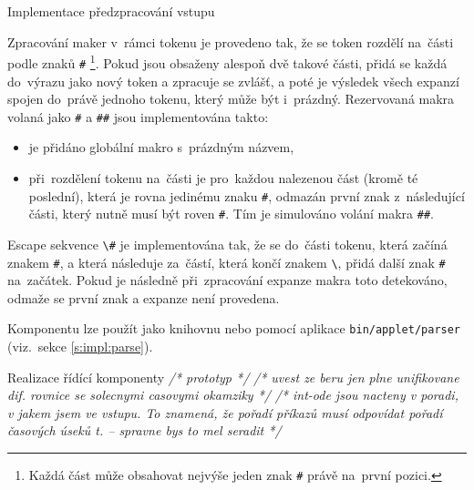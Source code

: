 \documentclass[thesis=M,czech]{FITthesis}[2012/06/26]
\newcommand{\cmt}[1]{\textit{/* #1 */}}
\newcommand{\id}[1]{\texttt{#1}}
\newcommand{\rf}[1]{\ref{#1}}
\newcommand{\binDir}{\id{bin}}
\newcommand{\appletDir}{\id{\binDir{}/\-applet}}
\newcommand{\appletFn}[1]{\id{\appletDir{}/\-#1}}
\begin{document}
\begin{section}{Implementace předzpracování vstupu}

\begin{paragraph}{Zpracování maker v~rámci tokenu}
\label{s:impl:preprocess:in_token}
je provedeno tak, že se token rozdělí na~části
podle znaků \id{\#}%
\footnote{Každá část může obsahovat nejvýše jeden znak \id{\#}
právě na~první pozici.}.
Pokud jsou obsaženy alespoň dvě takové části,
přidá se každá do~výrazu
jako nový token a zpracuje se zvlášť,
a poté je výsledek všech expanzí spojen do~právě jednoho tokenu,
který může být i~prázdný.
Rezervovaná makra volaná jako \id{\#} a \id{\#\#}
jsou implementována takto:
\begin{itemize}
\item je přidáno globální makro s~prázdným názvem,
\item při~rozdělení tokenu na~části
   je pro~každou nalezenou část (kromě té poslední),
   která je rovna jedinému znaku \id{\#},
   odmazán první znak z~následující části,
   který nutně musí být roven \id{\#}.
   Tím je simulováno volání makra \id{\#\#}.
\end{itemize}
\end{paragraph} %


\begin{paragraph}{Escape sekvence}\label{s:impl:preprocess:escape}
\id{\textbackslash\#}
je implementována tak,
že se do~části tokenu, která začíná znakem \id{\#},
a která následuje za~částí,
která končí znakem \id{\textbackslash},
přidá další znak \id{\#} na~začátek.
Pokud je následně při~zpracování expanze makra
toto detekováno, odmaže se první znak
a expanze není provedena.
\end{paragraph} %


\bigskip

Komponentu lze použít jako knihovnu
nebo pomocí aplikace \appletFn{parser}
(viz.~sekce \rf{s:impl:parse}).
\end{section} %



\begin{section}{Realizace řídící komponenty}\label{s:impl:center}
\cmt{prototyp}
\cmt{uvest ze beru jen plne unifikovane dif. rovnice
 se solecnymi casovymi okamziky}
 \cmt{int-ode jsou nacteny v poradi, v jakem jsem ve vstupu. To znamená, že pořadí příkazů musí odpovídat
pořadí časových úseků t. -- spravne bys to mel seradit}
\end{section} %
\end{document}
